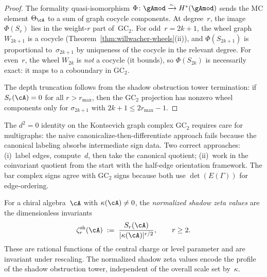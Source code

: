 \begin{proof}
The formality quasi-isomorphism $\Phi\colon \gAmod \xrightarrow{\sim}
H^*(\gAmod)$ sends the MC element $\Theta_\cA$ to a sum of graph
cocycle components. At degree~$r$, the image $\Phi(S_r)$ lies in the
weight-$r$ part of~$\mathrm{GC}_2$. For odd~$r = 2k{+}1$, the
wheel graph $W_{2k+1}$ is a cocycle
(Theorem~\ref{thm:willwacher-wheels}(ii)),
and $\Phi(S_{2k+1})$ is proportional to~$\sigma_{2k+1}$ by
uniqueness of the cocycle in the relevant degree. For even~$r$, the
wheel $W_{2k}$ is \emph{not} a cocycle (it bounds), so $\Phi(S_{2k})$
is necessarily exact: it maps to a coboundary in $\mathrm{GC}_2$.

The depth truncation follows from the shadow obstruction tower termination:
if $S_r(\cA) = 0$ for all $r > r_{\max}$, then the
$\mathrm{GC}_2$ projection has nonzero wheel components only for
$\sigma_{2k+1}$ with $2k{+}1 \leq 2r_{\max} - 1$.
\end{proof}

\begin{remark}
\label{rem:gc-multigraph-signs}
The $d^2 = 0$ identity on the Kontsevich graph complex
$\mathrm{GC}_2$ requires care for multigraphs: the naive
canonicalize-then-differentiate approach fails because the
canonical labeling absorbs intermediate sign data. Two correct
approaches: (i)~label edges, compute~$d$, then take the canonical
quotient; (ii)~work in the coinvariant quotient from the start
with the half-edge orientation framework. The bar complex signs
agree with $\mathrm{GC}_2$ signs because both use
$\det(E(\Gamma))$ for edge-ordering.
\end{remark}

\begin{definition}
\label{def:shadow-zeta-values}
For a chiral algebra~$\cA$ with $\kappa(\cA) \neq 0$, the
\emph{normalized shadow zeta values} are the dimensionless
invariants
\begin{equation}\label{eq:shadow-zeta}
\zeta^{\mathrm{sh}}_r(\cA) \;:=\;
\frac{S_r(\cA)}{|\kappa(\cA)|^{r/2}},
\qquad r \geq 2.
\end{equation}
These are rational functions of the central charge or level parameter
and are invariant under rescaling. The normalized shadow zeta values
encode the profile of the shadow obstruction tower, independent of the overall
scale set by~$\kappa$.
\end{definition}


